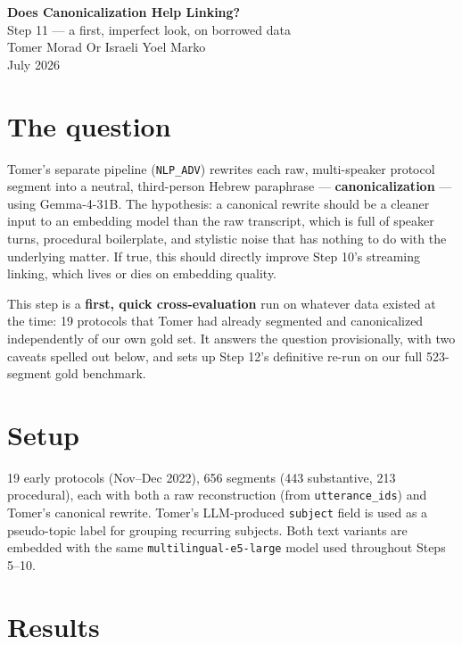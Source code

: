 \documentclass[11pt,a4paper]{article}
\begin{document}
\begin{center}
  {\LARGE \textbf{Does Canonicalization Help Linking?}}\\[0.3em]
  {\large Step 11 --- a first, imperfect look, on borrowed data}\\[0.6em]
  {\normalsize Tomer Morad \quad Or Israeli \quad Yoel Marko}\\
  {\normalsize July 2026}
\end{center}

\vspace{0.4em}

\section{The question}

Tomer's separate pipeline (\texttt{NLP\_ADV}) rewrites each raw, multi-speaker protocol
segment into a neutral, third-person Hebrew paraphrase --- \textbf{canonicalization} --- using
Gemma-4-31B. The hypothesis: a canonical rewrite should be a cleaner input to an embedding
model than the raw transcript, which is full of speaker turns, procedural boilerplate,
and stylistic noise that has nothing to do with the underlying matter. If true, this should
directly improve Step 10's streaming linking, which lives or dies on embedding quality.

This step is a \textbf{first, quick cross-evaluation} run on whatever data existed at the
time: 19 protocols that Tomer had already segmented and canonicalized independently of our
own gold set. It answers the question provisionally, with two caveats spelled out below,
and sets up Step 12's definitive re-run on our full 523-segment gold benchmark.

\section{Setup}

19 early protocols (Nov--Dec 2022), 656 segments (443 substantive, 213 procedural), each
with both a raw reconstruction (from \texttt{utterance\_ids}) and Tomer's canonical rewrite.
Tomer's LLM-produced \texttt{subject} field is used as a pseudo-topic label for grouping
recurring subjects. Both text variants are embedded with the same
\texttt{multilingual-e5-large} model used throughout Steps 5--10.

\section{Results}
\end{document}
